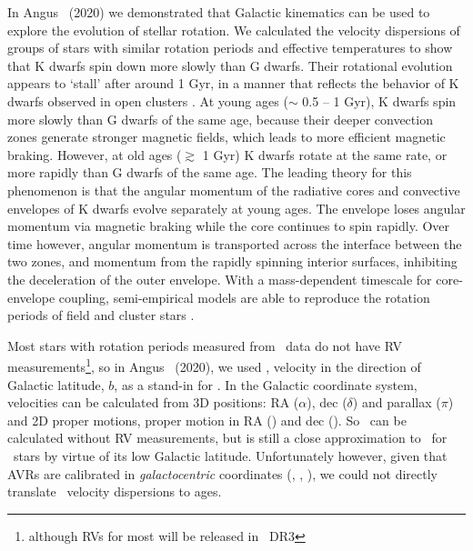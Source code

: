 In Angus \etal\ (2020) we demonstrated that Galactic kinematics can be used to
explore the evolution of stellar rotation.
We calculated the velocity dispersions of groups of stars with similar
rotation periods and effective temperatures to show that K dwarfs spin down
more slowly than G dwarfs.
Their rotational evolution appears to `stall' after around 1 Gyr, in a manner
that reflects the behavior of K dwarfs observed in open clusters
\citep{curtis2019}.
At young ages ($\sim$ 0.5 -- 1 Gyr), K dwarfs spin more slowly than G dwarfs of
the same age, because their deeper convection zones generate stronger magnetic
fields, which leads to more efficient magnetic braking.
However, at old ages ($\gtrsim$ 1 Gyr) K dwarfs rotate at the same rate, or more
rapidly than G dwarfs of the same age.
The leading theory for this phenomenon is that the angular momentum of the
radiative cores and convective envelopes of K dwarfs evolve separately at
young ages.
The envelope loses angular momentum via magnetic braking while the core
continues to spin rapidly.
Over time however, angular momentum is transported across the interface
between the two zones, and momentum from the rapidly spinning interior
surfaces, inhibiting the deceleration of the outer envelope.
With a mass-dependent timescale for core-envelope coupling, semi-empirical
models are able to reproduce the rotation periods of field and cluster stars
\citep[][Angus \etal, 2020]{spada2019, curtis2019}.

Most stars with rotation periods measured from \kepler\ data do not have RV
measurements\footnote{although RVs for most will be released in \gaia\ DR3},
so in Angus \etal\ (2020), we used \vb, velocity in the direction of Galactic
latitude, $b$, as a stand-in for \vz.
In the Galactic coordinate system, velocities can be calculated from 3D
positions: RA ($\alpha$), dec ($\delta$) and parallax ($\pi$) and 2D proper
motions, proper motion in RA (\mura) and dec (\mudec).
So \vb\ can be calculated without RV measurements, but is still a close
approximation to \vz\ for \kepler\ stars by virtue of its low Galactic
latitude.
Unfortunately however, given that AVRs are calibrated in {\it galactocentric}
coordinates (\vx, \vy, \vz), we could not directly translate \vb\ velocity
dispersions to ages.

